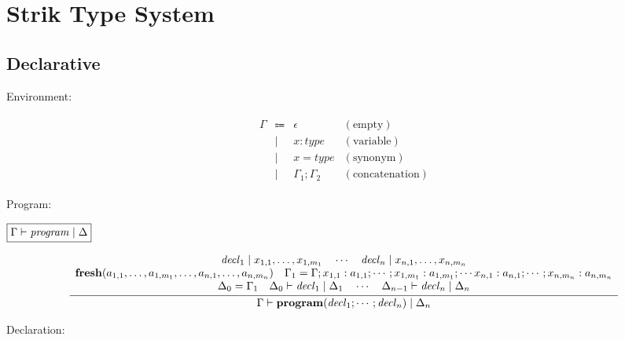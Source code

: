\section{Strik Type System}

\subsection{Declarative}

Environment:

\begin{align*}
  \begin{array}{rclr}
    \Gamma
    & \Coloneq & \epsilon &(\text{empty}) \\
    & \mid & x: \mathit{type} &(\text{variable}) \\
    & \mid & x = \mathit{type} &(\text{synonym}) \\
    & \mid & \Gamma_1; \Gamma_2 &(\text{concatenation})
  \end{array}
\end{align*}

Program:

$\fbox{$\Gamma \vdash \mathit{program} \mid \Delta$}$

\begin{gather*}
  \infer{\Gamma \vdash \mathbf{program}(\mathit{decl}_1; \cdots; \mathit{decl}_n) \mid \Delta_n}{
    \begin{array}{c}
      \mathit{decl}_1 \mid x_{1,1}, \ldots, x_{1,m_1}
      \hspace{1em}
      \cdots
      \hspace{1em}
      \mathit{decl}_n \mid x_{n,1}, \ldots, x_{n,m_n}
      \\
      \mathbf{fresh}(a_{1,1}, \ldots, a_{1, m_1}, \ldots, a_{n,1}, \ldots, a_{n, m_n})
      \hspace{1em}
      \Gamma_1 = \Gamma; x_{1,1}: a_{1,1}; \cdots; x_{1,m_1}: a_{1, m_1}; \cdots x_{n,1}: a_{n,1}; \cdots; x_{n,m_n}: a_{n,m_n}
      \\
      \Delta_0 = \Gamma_1
      \hspace{1em}
      \Delta_0 \vdash \mathit{decl}_1 \mid \Delta_1
      \hspace{1em}
      \cdots
      \hspace{1em}
      \Delta_{n - 1} \vdash \mathit{decl}_n \mid \Delta_n
    \end{array}
  }
\end{gather*}

Declaration:

